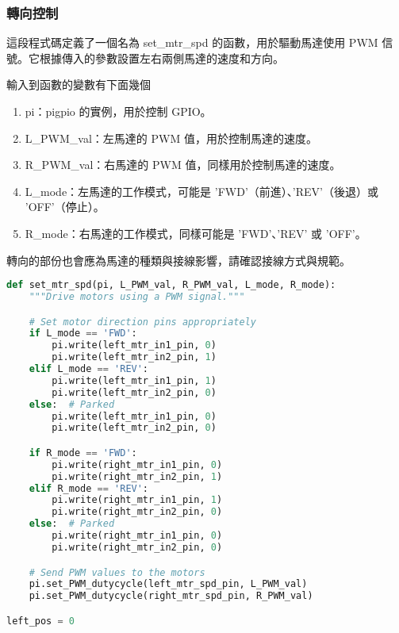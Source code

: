 \subsubsection{轉向控制}
這段程式碼定義了一個名為 set\_mtr\_spd 的函數，用於驅動馬達使用 PWM 信號。它根據傳入的參數設置左右兩側馬達的速度和方向。

輸入到函數的變數有下面幾個
\begin{enumerate}
    \item pi：pigpio 的實例，用於控制 GPIO。
    \item L\_PWM\_val：左馬達的 PWM 值，用於控制馬達的速度。
    \item R\_PWM\_val：右馬達的 PWM 值，同樣用於控制馬達的速度。
    \item L\_mode：左馬達的工作模式，可能是 'FWD'（前進）、'REV'（後退）或 'OFF'（停止）。
    \item R\_mode：右馬達的工作模式，同樣可能是 'FWD'、'REV' 或 'OFF'。
\end{enumerate}

轉向的部份也會應為馬達的種類與接線影響，請確認接線方式與規範。

\begin{lstlisting}[language=Python, caption=馬達動作定義]
def set_mtr_spd(pi, L_PWM_val, R_PWM_val, L_mode, R_mode):
    """Drive motors using a PWM signal."""

    # Set motor direction pins appropriately
    if L_mode == 'FWD':
        pi.write(left_mtr_in1_pin, 0)
        pi.write(left_mtr_in2_pin, 1)
    elif L_mode == 'REV':
        pi.write(left_mtr_in1_pin, 1)
        pi.write(left_mtr_in2_pin, 0)
    else:  # Parked
        pi.write(left_mtr_in1_pin, 0)
        pi.write(left_mtr_in2_pin, 0)

    if R_mode == 'FWD':
        pi.write(right_mtr_in1_pin, 0)
        pi.write(right_mtr_in2_pin, 1)
    elif R_mode == 'REV':
        pi.write(right_mtr_in1_pin, 1)
        pi.write(right_mtr_in2_pin, 0)
    else:  # Parked
        pi.write(right_mtr_in1_pin, 0)
        pi.write(right_mtr_in2_pin, 0)

    # Send PWM values to the motors
    pi.set_PWM_dutycycle(left_mtr_spd_pin, L_PWM_val)
    pi.set_PWM_dutycycle(right_mtr_spd_pin, R_PWM_val)

left_pos = 0
\end{lstlisting}

